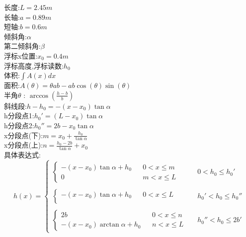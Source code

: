 \documentclass[UTF8]{ctexart}
\begin{document}
    长度:\(L = 2.45m\)\\
    长轴:\(a = 0.89m\)\\
    短轴:\(b = 0.6m\)\\
    倾斜角:\(\alpha\)\\
    第二倾斜角:\(\beta\)\\
    浮标x位置:\(x_0 = 0.4m\)\\
    浮标高度,浮标读数:\(h_0\)\\
    体积:\(\int A(x)dx\)\\
    面积:\(A(\theta) = \theta ab - ab\cos (\theta) \sin (\theta)\)\\
    半角\(\theta\) : \(\arccos(\frac{h-b}{b})\)\\
    
    斜线段:\(h-h_0 = - (x-x_0) \tan\alpha\)\\
    h分段点1:\(h_0' = (L-x_0) \tan\alpha\)\\
    h分段点2:\(h_0'' = 2b - x_0 \tan\alpha\)\\
    x分段点(下):\(m = x_0+\frac{h_0}{\tan\alpha}\)\\
    x分段点(上):\(n = \frac{h_0-2b}{\tan\alpha} + x_0\)\\

    具体表达式:
    \begin{equation}
        h(x)=\left\{
        \begin{aligned}
            \left\{
                \begin{aligned}
                    - (x-x_0) \tan\alpha + h_0& &0<x\leq m \\
                    0 & &m < x \leq L
                \end{aligned}
            \right. & & 0<h_0\leq h_0'\\
            &&\\
            \left\{
                \begin{aligned}
                    - (x-x_0) \tan\alpha + h_0& &0<x\leq L \\
                \end{aligned}
            \right. & & h_0'<h_0\leq h_0''\\
            &&\\
            \left\{
                \begin{aligned}
                    2b & &0<x\leq n\\
                    - (x-x_0) \arctan\alpha + h_0& &n<x\leq L  
                \end{aligned}
            \right.& & h_0''<h_0\leq 2b'
        \end{aligned}
        \right.
    \end{equation}
\end{document}

